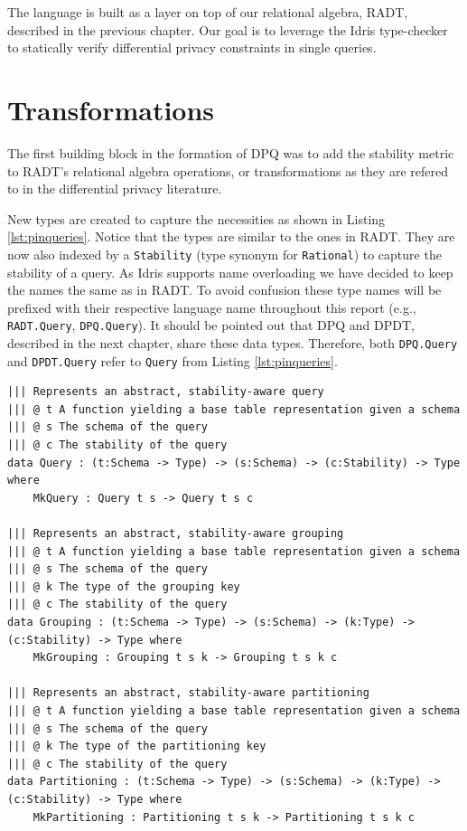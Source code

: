\documentclass[12pt]{report}
\begin{document}
The language is built as a layer on top of our relational algebra, RADT, described in the previous chapter.
Our goal is to leverage the Idris type-checker to statically verify differential privacy constraints in single queries.

\section{Transformations}

The first building block in the formation of DPQ was to add the stability metric to RADT's relational algebra operations, or transformations as they are refered to in the differential privacy literature.

New types are created to capture the necessities as shown in Listing \ref{lst:pinqueries}.
Notice that the types are similar to the ones in RADT.
They are now also indexed by a \texttt{Stability} (type synonym for \texttt{Rational}) to capture the stability of a query.
As Idris supports name overloading we have decided to keep the names the same as in RADT.
To avoid confusion these type names will be prefixed with their respective language name throughout this report (e.g., \texttt{RADT.Query}, \texttt{DPQ.Query}).
It should be pointed out that DPQ and DPDT, described in the next chapter, share these data types.
Therefore, both \texttt{DPQ.Query} and \texttt{DPDT.Query} refer to \texttt{Query} from Listing \ref{lst:pinqueries}.

\begin{lstlisting}[caption={Representing privacy-aware queries},label={lst:pinqueries}]
||| Represents an abstract, stability-aware query
||| @ t A function yielding a base table representation given a schema
||| @ s The schema of the query
||| @ c The stability of the query
data Query : (t:Schema -> Type) -> (s:Schema) -> (c:Stability) -> Type where
    MkQuery : Query t s -> Query t s c

||| Represents an abstract, stability-aware grouping
||| @ t A function yielding a base table representation given a schema
||| @ s The schema of the query
||| @ k The type of the grouping key
||| @ c The stability of the query
data Grouping : (t:Schema -> Type) -> (s:Schema) -> (k:Type) -> (c:Stability) -> Type where
    MkGrouping : Grouping t s k -> Grouping t s k c

||| Represents an abstract, stability-aware partitioning
||| @ t A function yielding a base table representation given a schema
||| @ s The schema of the query
||| @ k The type of the partitioning key
||| @ c The stability of the query
data Partitioning : (t:Schema -> Type) -> (s:Schema) -> (k:Type) -> (c:Stability) -> Type where
    MkPartitioning : Partitioning t s k -> Partitioning t s k c
\end{lstlisting}
\end{document}
